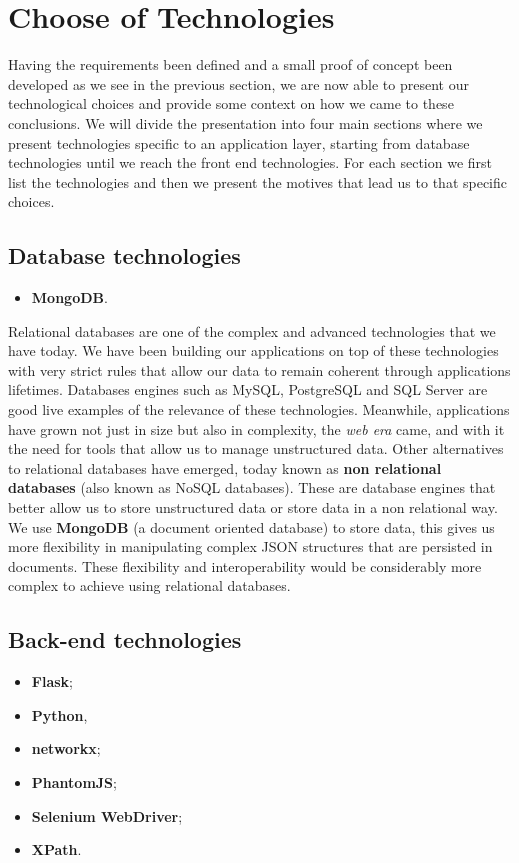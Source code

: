 \section{Choose of Technologies}
Having the requirements been defined and a small proof of concept been developed as we see in the previous section, we are now able to present our technological choices and provide some context on how we came to these conclusions. We will divide the presentation into four main sections where we present technologies specific to an application layer, starting from database technologies until we reach the front end technologies. For each section we first list the technologies and then we present the motives that lead us to that specific choices.

\subsection{Database technologies}
\begin{itemize}
    \item \textbf{MongoDB}.
\end{itemize}

Relational databases are one of the complex and advanced technologies that we have today. We have been building our applications on top of these technologies with very strict rules that allow our data to remain coherent through applications lifetimes. Databases engines such as MySQL, PostgreSQL and SQL Server are good live examples of the relevance of these technologies. Meanwhile, applications have grown not just in size but also in complexity, the \textit{web era} came, and with it the need for tools that allow us to manage unstructured data. Other alternatives to relational databases have emerged, today known as \textbf{non relational databases} (also known as NoSQL databases). These are database engines that better allow us to store unstructured data or store data in a non relational way.\\
\indent We use \textbf{MongoDB} \citep{mongodb} (a document oriented database) to store data, this gives us more flexibility in manipulating complex JSON structures that are persisted in documents. These flexibility and interoperability would be considerably more complex to achieve using relational databases.

\subsection{Back-end technologies}
\begin{itemize}
    \item \textbf{Flask};
    \item \textbf{Python},
    \item \textbf{networkx};
    \item \textbf{PhantomJS};
    \item \textbf{Selenium WebDriver};
    \item \textbf{XPath}.
\end{itemize}

